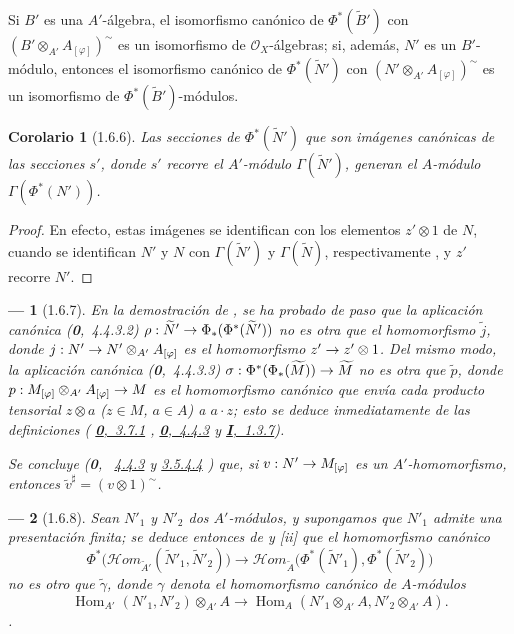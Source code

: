 \documentclass[oneside]{amsart}
\makeatletter
\theoremstyle{ega-env-style}
\newtheorem*{env}{---}
\theoremstyle{ega-thm-env-style}
\newtheorem*{corollary}{Corolario}
\theoremstyle{ega-defn-env-style}
\renewcommand{\to}{\mathchoice{\longrightarrow}{\rightarrow}{\rightarrow}{\rightarrow}}
\newcommand{\oldpage}[2][]{{\marginnote{\normalfont{\textbf{#1}~|~#2}}}\ignorespaces}
\let\EGAOriginalLabel\label
\renewcommand{\label}[1]{\phantomsection\EGAOriginalLabel{#1}}
\newcommand{\EGAUnavailableHyperref}[2]{%
  \begingroup
  \let\@latex@warning\@gobble
  \let\@latex@warning@no@line\@gobble
  \let\G@refundefinedtrue\relax
  \hyperref[#1]{#2}%
  \endgroup
}
\makeatother
\begin{document}
Si $B'$ es una $A'$-álgebra, el isomorfismo canónico de $\Phi^*(\widetilde{B}')$ con $(B'\otimes_{A'}A_{[\varphi]})^{\sim}$ es un isomorfismo de $\mathscr{O}_X$-álgebras;
si, además, $N'$ es un $B'$-módulo, entonces el isomorfismo canónico de $\Phi^*(\widetilde{N}')$ con $(N'\otimes_{A'}A_{[\varphi]})^{\sim}$ es un isomorfismo de $\Phi^*(\widetilde{B}')$-módulos.

\begin{corollary}[1.6.6]
\label{I.1.6.6}
Las secciones de $\Phi^*(\widetilde{N}')$ que son imágenes canónicas de las secciones $s'$, donde $s'$ recorre el $A'$-módulo $\Gamma(\widetilde{N}')$, generan el $A$-módulo $\Gamma(\Phi^*(N'))$.
\end{corollary}

\begin{proof}
En efecto, estas imágenes se identifican con los elementos $z'\otimes 1$ de $N$, cuando se identifican $N'$ y $N$ con $\Gamma(\widetilde{N}')$ y $\Gamma(\widetilde{N})$, respectivamente , y $z'$ recorre $N'$.
\end{proof}

\begin{env}[1.6.7]
\label{I.1.6.7}
En la demostración de , se ha probado de paso que la aplicación canónica (\textbf{0},~4.4.3.2) $\rho:\widetilde{N}'\to\Phi_*(\Phi^*(\widetilde{N}'))$ no es otra que el homomorfismo $\widetilde{j}$,
\oldpage[I]{96}
donde $j:N'\to N'\otimes_{A'}A_{[\varphi]}$ es el homomorfismo $z'\to z'\otimes 1$.
Del mismo modo, la aplicación canónica (\textbf{0},~4.4.3.3) $\sigma:\Phi^*(\Phi_*(\widetilde{M}))\to\widetilde{M}$ no es otra que $\widetilde{p}$, donde $p:M_{[\varphi]}\otimes_{A'}A_{[\varphi]}\to M$ es el homomorfismo canónico que envía cada producto tensorial $z\otimes a$ ($z\in M$, $a\in A$) a $a\cdot z$;
esto se deduce inmediatamente de las definiciones (\EGAUnavailableHyperref{0.3.7.1}{\textbf{0},~3.7.1}, \EGAUnavailableHyperref{0.4.4.3}{\textbf{0},~4.4.3} y \hyperref[I.1.3.7]{\textbf{I},~1.3.7}).

Se concluye (\textbf{0},~\EGAUnavailableHyperref{0.4.4.3}{4.4.3} y \EGAUnavailableHyperref{0.3.5.4.4}{3.5.4.4}) que, si $v:N'\to M_{[\varphi]}$ es un $A'$-homomorfismo, entonces $\widetilde{v}^{\sharp}=(v\otimes 1)^{\sim}$.
\end{env}

\begin{env}[1.6.8]
\label{I.1.6.8}
Sean $N'_1$ y $N'_2$ dos $A'$-módulos, y supongamos que $N'_1$ admite una \emph{presentación finita};
se deduce entonces de  y [ii] que el
homomorfismo canónico 
\[
  \Phi^*\bigl(\mathscr{H}\!om_{\widetilde{A}'}
    (\widetilde{N}'_1,\widetilde{N}'_2)\bigr)
  \longrightarrow
  \mathscr{H}\!om_{\widetilde A}
    \bigl(\Phi^*(\widetilde{N}'_1),\Phi^*(\widetilde{N}'_2)\bigr)
\]
no es otro que $\widetilde{\gamma}$, donde $\gamma$ denota el homomorfismo canónico de $A$-módulos \[
  \operatorname{Hom}_{A'}(N'_1,N'_2)\otimes_{A'}A
  \longrightarrow
  \operatorname{Hom}_A(N'_1\otimes_{A'}A,N'_2\otimes_{A'}A).
\].
\end{env}
\end{document}
